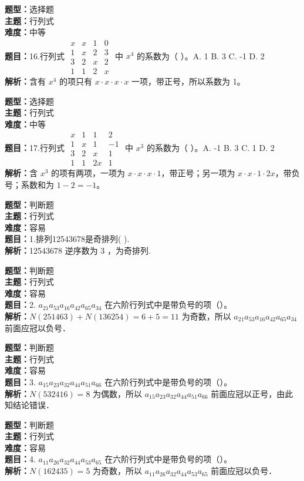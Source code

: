 \documentclass{ctexart}
\newenvironment{question}[5]{%
	\noindent\textbf{题型：}#1\\
	\textbf{主题：}#2\\
	\textbf{难度：}#3\\
	\textbf{题目：}#4\\
	\textbf{解析：}#5\\
	\vspace{1em}
}{}
\begin{document}
	\begin{question}
		{选择题}
		{行列式}
		{中等}
		{16.行列式 $\begin{matrix}x & x & 1 & 0 \\ 1 & x & 2 & 3 \\ 3 & 2 & x & 2 \\ 1 & 1 & 2 & x\end{matrix}$ 中 $x^4$ 的系数为（ ）。A. 1 B. 3 C. -1 D. 2}
		{含有 $x^4$ 的项只有 $x\cdot x\cdot x\cdot x$ 一项，带正号，所以系数为 1。}
	\end{question}
	
	\begin{question}
		{选择题}
		{行列式}
		{中等}
		{17.行列式 $\begin{matrix}x & 1 & 1 & 2 \\ 1 & x & 1 & -1 \\ 3 & 2 & x & 1 \\ 1 & 1 & 2x & 1\end{matrix}$ 中 $x^3$ 的系数为（ ）。A. -1 B. 3 C. 1 D. 2}
		{含 $x^3$ 的项有两项，一项为 $x\cdot x\cdot x\cdot1$，带正号；另一项为 $x\cdot x\cdot1\cdot2x$，带负号；系数和为 $1-2=-1$。}
	\end{question}
	
	\begin{question}
		{判断题}
		{行列式}
		{容易}
		{1.排列12543678是奇排列(  ).}
		{12543678 逆序数为 3 ，为奇排列.}
	\end{question}
	
	
	\begin{question}
		{判断题}
		{行列式}
		{容易}
		{2. $a_{21} a_{53} a_{16} a_{42} a_{65} a_{34}$ 在六阶行列式中是带负号的项（）。}
		{$N(251463)+N(136254)=6+5=11$ 为奇数，所以 $a_{21} a_{53} a_{16} a_{42} a_{65} a_{34}$ 前面应冠以负号．}
	\end{question}
	
	\begin{question}
		{判断题}
		{行列式}
		{容易}
		{3. $a_{15} a_{23} a_{32} a_{44} a_{51} a_{66}$ 在六阶行列式中是带负号的项（）。}
		{$N(532416)=8$ 为偶数，所以 $a_{15} a_{23} a_{32} a_{44} a_{51} a_{66}$ 前面应冠以正号，由此知结论错误．}
	\end{question}
	
	\begin{question}
		{判断题}
		{行列式}
		{容易}
		{4. $a_{11} a_{26} a_{32} a_{44} a_{53} a_{65}$ 在六阶行列式中是带负号的项（）。}
		{$N(162435)=5$ 为奇数，所以 $a_{11} a_{26} a_{32} a_{44} a_{53} a_{65}$ 前面应冠以负号．}
	\end{question}
	
\end{document}
